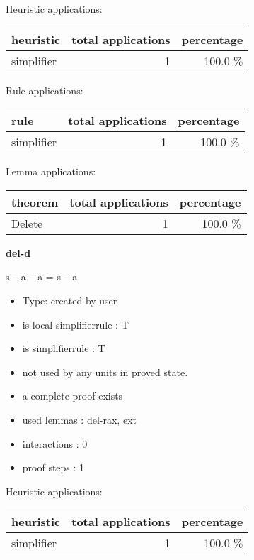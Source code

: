 \documentclass[a4paper]{article}
\begin{document}
Heuristic applications:

\begin{supertabular}{l|r|r}
heuristic	& total applications & percentage \\ \hline
simplifier & 1 & 100.0 \% \\

\end{supertabular}

Rule applications:

\begin{supertabular}{l|r|r}
rule	        & total applications & percentage \\ \hline
simplifier & 1 & 100.0 \% \\

\end{supertabular}

Lemma applications:

\begin{supertabular}{l|r|r}
theorem	        & total applications & percentage \\ \hline
Delete & 1 & 100.0 \% \\

\end{supertabular}
\pagebreak

{\LARGE\bf del-d}\label{lemma-del-d}

\medskip

 \Fol s -- a -- a = s -- a

\begin{itemize}

\item Type: created by user

\item is local simplifierrule : T
\item is simplifierrule : T
\item not used by any units in proved state.
\item       a complete proof exists
\item       used lemmas  : del-rax, ext
\item       interactions : 0
\item       proof steps  : 1
\end{itemize}

\medskip


Heuristic applications:

\begin{supertabular}{l|r|r}
heuristic	& total applications & percentage \\ \hline
simplifier & 1 & 100.0 \% \\

\end{supertabular}
\end{document}
